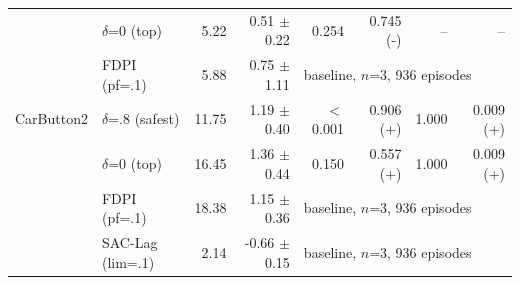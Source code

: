 \begin{tabular}{llrrrrrr}
 & $\delta$=0 (top) & 5.22 & 0.51 $\pm$ 0.22 & 0.254 & 0.745 (-) & -- & -- \\
 & FDPI (pf=.1) & 5.88 & 0.75 $\pm$ 1.11 & \multicolumn{4}{l}{baseline, $n$=3, 936 episodes} \\
\midrule
CarButton2 & $\delta$=.8 (safest) & 11.75 & 1.19 $\pm$ 0.40 & $<$0.001 & 0.906 (+) & 1.000 & 0.009 (+) \\
 & $\delta$=0 (top) & 16.45 & 1.36 $\pm$ 0.44 & 0.150 & 0.557 (+) & 1.000 & 0.009 (+) \\
 & FDPI (pf=.1) & 18.38 & 1.15 $\pm$ 0.36 & \multicolumn{4}{l}{baseline, $n$=3, 936 episodes} \\
 & SAC-Lag (lim=.1) & 2.14 & -0.66 $\pm$ 0.15 & \multicolumn{4}{l}{baseline, $n$=3, 936 episodes} \\
\bottomrule
\end{tabular}
